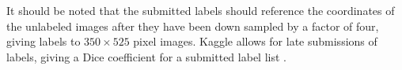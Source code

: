 It should be noted that the submitted labels should reference the coordinates of the unlabeled images after they have been down sampled by a factor of four, giving labels to \(350 \times 525\) pixel images. Kaggle allows for late submissions of labels, giving a Dice coefficient for a submitted label list \cite{maxplanckinstituteformeteorology_UnderstandingCloudsSatellite_}. 